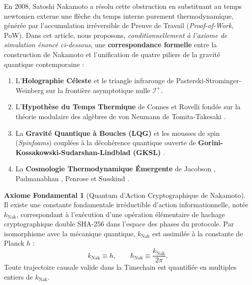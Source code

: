 \documentclass[10pt,twocolumn,a4paper]{article}
\theoremstyle{plain}
\theoremstyle{definition}
\newtheorem{axiom}{Axiome Fondamental}
\theoremstyle{remark}
\newcommand{\kNak}{k_{\text{Nak}}}
\newcommand{\scri}{\mathcal{I}}
\begin{document}
En 2008, Satoshi Nakamoto \cite{Nakamoto2008} a résolu cette obstruction en substituant au temps newtonien externe une flèche du temps interne purement thermodynamique, générée par l'accumulation irréversible de Preuve de Travail (\textit{Proof-of-Work}, PoW). Dans cet article, nous proposons, \emph{conditionnellement à l'axiome de simulation énoncé ci-dessous}, une \textbf{correspondance formelle} entre la construction de Nakamoto et l'unification de quatre piliers de la gravité quantique contemporaine :
\begin{enumerate}
    \item L'\textbf{Holographie Céleste} et le triangle infrarouge de Pasterski-Strominger-Weinberg \cite{Pasterski2017,Strominger2017} sur la frontière asymptotique nulle $\scri^+$.
    \item L'\textbf{Hypothèse du Temps Thermique} de Connes et Rovelli \cite{ConnesRovelli1994} fondée sur la théorie modulaire des algèbres de von Neumann de Tomita-Takesaki \cite{Takesaki1970}.
    \item La \textbf{Gravité Quantique à Boucles (LQG)} et les mousses de spin (\textit{Spinfoams}) \cite{Rovelli2004} couplées à la décohérence quantique ouverte de \textbf{Gorini-Kossakowski-Sudarshan-Lindblad (GKSL)} \cite{Lindblad1976,GKS1976}.
    \item La \textbf{Cosmologie Thermodynamique Émergente} de Jacobson \cite{Jacobson1995}, Padmanabhan \cite{Padmanabhan2012}, Penrose \cite{Penrose1979} et Susskind \cite{Susskind2016}.
\end{enumerate}

\begin{axiom}[Quantum d'Action Cryptographique de Nakamoto]
Il existe une constante fondamentale irréductible d'action informationnelle, notée $\kNak$, correspondant à l'exécution d'une opération élémentaire de hachage cryptographique double SHA-256 dans l'espace des phases du protocole. Par isomorphisme avec la mécanique quantique, $\kNak$ est assimilée à la constante de Planck $h$ :
\begin{equation}
    \kNak \equiv h, \qquad \hbar_{\text{Nak}} \equiv \frac{\kNak}{2\pi}.
    \label{eq:AxiomNakamoto}
\end{equation}
Toute trajectoire causale valide dans la Timechain est quantifiée en multiples entiers de $\kNak$.
\end{axiom}
\end{document}
